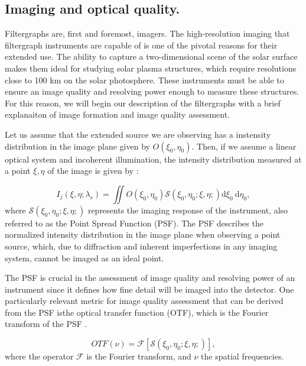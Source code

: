 \subsection{Imaging and optical quality.\label{sec: intro-imaging}}

Filtergraphs are, first and foremost, imagers. The high-resolution imaging that filtergraph instruments are capable of is one of the pivotal reasons for their extended use. The ability to capture a two-dimensional scene of the solar surface makes them ideal for studying solar plasma structures, which require resolutions close to 100 km on the solar photosphere. These instruments must be able to ensure an image quality and resolving power enough to measure these structures. For this reason, we will begin our description of the filtergraphs with a brief explanaiton of image formation and image quality assessment. 

Let us assume that the extended source we are observing has a instensity distribution in the image plane given by $O(\xi _ 0, \eta _ 0)$. Then, if we assume a linear optical system and incoherent illumination, the intensity distribution measured at a point $\xi, \eta$ of the image is given by : 

\begin{equation}
  I_ j\left(\xi, \eta ; \lambda_{s}\right)= \iint  O\left(\xi_0, \eta_0\right)  \mathcal{S}\left(\xi_0, \eta_0; \xi , \eta;\right)  \mathrm{d} \xi_{0} \mathrm{~d} \eta_{0},
  \label{eq_imaging: intensity_simple}
\end{equation}
where $\mathcal{S}\left(\xi_0, \eta_0; \xi , \eta;\right)$ represents the imaging response of the instrument, also referred to as the Point Spread Function (PSF). The PSF describes the normalized intensity distribution in the image plane when observing a point source, which, due to diffraction and inherent imperfections in any imaging system, cannot be imaged as an ideal point.

The PSF is crucial in the assessment of image quality and resolving power of an instrument since it defines how fine detail will be imaged into the detector. One particularly relevant metric for image quality assessment that can be derived from the PSF isthe optical transfer function (OTF), which is the Fourier transform of the PSF \citep{vargas_tesis}. 

\begin{equation}
  OTF(\nu) = \mathcal{F}\left[\mathcal{S}\left(\xi_0, \eta_0; \xi , \eta;\right)\right],
\end{equation}
where the operator $\mathcal{F}$ is the Fourier transform, and $\nu$ the spatial frequencies.

